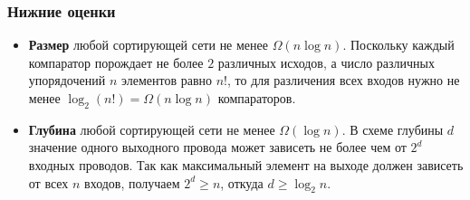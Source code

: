 \subsubsection*{Нижние оценки}
\begin{itemize}
	\item \textbf{Размер} любой сортирующей сети не менее $\Omega(n\log n)$.
	Поскольку каждый компаратор порождает не более $2$ различных исходов, а число различных упорядочений $n$ элементов равно $n!$, то для различения всех входов нужно не менее $\log_2(n!)=\Omega(n\log n)$ компараторов.
	\item \textbf{Глубина} любой сортирующей сети не менее $\Omega(\log n)$.
	В схеме глубины $d$ значение одного выходного провода может зависеть не более чем от $2^d$ входных проводов.
	Так как максимальный элемент на выходе должен зависеть от всех $n$ входов, получаем $2^d \ge n$, откуда $d \ge \log_2 n$.
\end{itemize}



